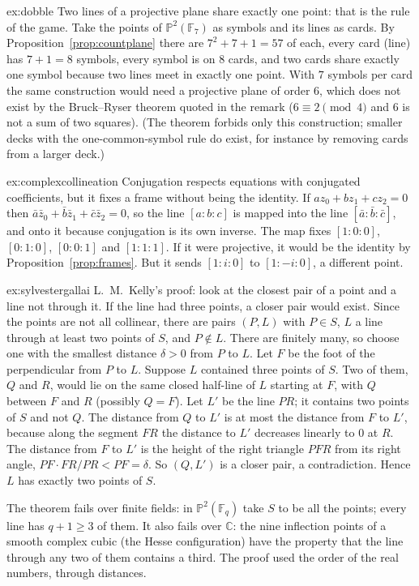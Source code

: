 \begin{solution}{ex:dobble}
\idea Two lines of a projective plane share exactly one point: that is the rule of the game.
\writeup Take the points of $\mathbb P^2(\mathbb F_7)$ as symbols and its lines as cards. By Proposition~\ref{prop:countplane} there are $7^2+7+1=57$
of each, every card (line) has $7+1=8$ symbols, every symbol is on $8$ cards, and two cards share exactly one symbol because two lines meet
in exactly one point. With $7$ symbols per card the same construction would need a projective plane of order $6$, which does not exist by the
Bruck--Ryser theorem quoted in the remark ($6\equiv2\pmod4$ and $6$ is not a sum of two squares). (The theorem forbids only this construction;
smaller decks with the one-common-symbol rule do exist, for instance by removing cards from a larger deck.)
\end{solution}

\begin{solution}{ex:complexcollineation}
\idea Conjugation respects equations with conjugated coefficients, but it fixes a frame without being the identity.
\writeup If $az_0+bz_1+cz_2=0$ then $\bar a\bar z_0+\bar b\bar z_1+\bar c\bar z_2=0$, so the line $[a:b:c]$ is mapped into the line $[\bar a:\bar b:\bar c]$,
and onto it because conjugation is its own inverse. The map fixes $[1:0:0]$, $[0:1:0]$, $[0:0:1]$ and $[1:1:1]$. If it were projective, it would be
the identity by Proposition~\ref{prop:frames}. But it sends $[1:i:0]$ to $[1:-i:0]$, a different point.
\end{solution}

\begin{solution}{ex:sylvestergallai}
\idea L.~M.~Kelly's proof: look at the closest pair of a point and a line not through it. If the line had three points, a closer pair would exist.
\writeup Since the points are not all collinear, there are pairs $(P,L)$ with $P\in S$, $L$ a line through at least two points of $S$, and
$P\notin L$. There are finitely many, so choose one with the smallest distance $\delta>0$ from $P$ to $L$. Let $F$ be the foot of the perpendicular
from $P$ to $L$. Suppose $L$ contained three points of $S$. Two of them, $Q$ and $R$, would lie on the same closed half-line of $L$ starting at
$F$, with $Q$ between $F$ and $R$ (possibly $Q=F$). Let $L'$ be the line $PR$; it contains two points of $S$ and not $Q$. The distance from $Q$ to
$L'$ is at most the distance from $F$ to $L'$, because along the segment $FR$ the distance to $L'$ decreases linearly to $0$ at $R$. The distance from
$F$ to $L'$ is the height of the right triangle $PFR$ from its right angle, $PF\cdot FR/PR<PF=\delta$. So $(Q,L')$ is a closer pair, a contradiction.
Hence $L$ has exactly two points of $S$.

The theorem fails over finite fields: in $\mathbb P^2(\mathbb F_q)$ take $S$ to be all the points; every line has $q+1\ge3$ of them. It also fails over
$\mathbb C$: the nine inflection points of a smooth complex cubic (the Hesse configuration) have the property that the line through any two of them contains a
third. The proof used the order of the real numbers, through distances.
\end{solution}


